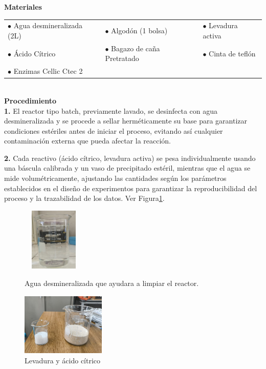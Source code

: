 \documentclass[12pt]{article}
\begin{document}
					 
					 	\textbf{Materiales} 
					 
					 \begin{tabular}{p{0.3\textwidth}p{}p{}}
					 	$\bullet$ Agua desmineralizada (2L) & $\bullet$ Algodón (1 bolsa) & $\bullet$ Levadura activa \\
					 	$\bullet$ Ácido Cítrico & $\bullet$ Bagazo de caña Pretratado & $\bullet$ Cinta de teflón\\
				  	$\bullet$ Enzimas Cellic Ctec 2& &\\
					 	
					 \end{tabular}
					 \\
					 
					 
					 
					  \textbf{Procedimiento}
					\\	 
		 \textbf{1.}  El reactor tipo batch, previamente lavado, se desinfecta con agua desmineralizada y se procede a sellar herméticamente su base para garantizar condiciones estériles antes de iniciar el proceso, evitando así cualquier contaminación externa que pueda afectar la reacción.

		 	
		 \textbf{2.} Cada reactivo (ácido cítrico, levadura activa) se pesa individualmente usando una báscula calibrada y un vaso de precipitado estéril, mientras que el agua se mide volumétricamente, ajustando las cantidades según los parámetros establecidos en el diseño de experimentos para garantizar la reproducibilidad del proceso y la trazabilidad de los datos. Ver Figura\ref{pesado2}.
		 
	
		 
		 \begin{figure}[H]
		 	\centering
		 	\begin{minipage}{0.46\textwidth}
		 		\centering
		 		\includegraphics[width=3cm, height=3cm]{imagenes/agua} %
		 		\caption{ Agua desmineralizada que ayudara a limpiar el reactor.}
		 		\label{agua}
		 	\end{minipage}
		 	\hfill
		 	\begin{minipage}{0.48\textwidth}
		 		\centering
		 		\includegraphics[width=4cm, height=3cm]{imagenes/levadura y acido citrico} %
		 		\caption{Levadura y ácido cítrico}
		 		\label{pesado2}
		 	\end{minipage}
		 \end{figure}
		 
\end{document}
